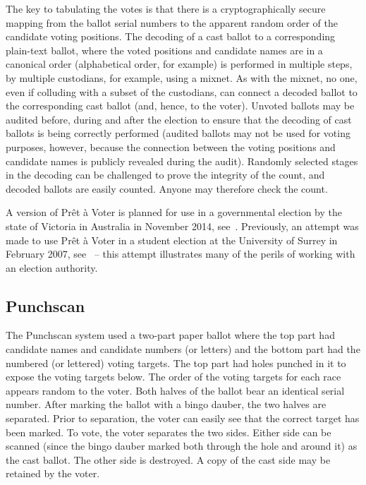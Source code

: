 The key to tabulating the votes is that there is a cryptographically
secure mapping from the ballot serial numbers to the apparent random
order of the candidate voting positions.  The decoding of a cast
ballot to a corresponding plain-text ballot, where the voted positions
and candidate names are in a canonical order (alphabetical order, for
example) is performed in multiple steps, by multiple custodians, for
example, using a mixnet. As with the mixnet, no one, even if colluding
with a subset of the custodians, can connect a decoded ballot to the
corresponding cast ballot (and, hence, to the voter).  Unvoted ballots
may be audited before, during and after the election to ensure that
the decoding of cast ballots is being correctly performed (audited
ballots may not be used for voting purposes, however, because the
connection between the voting positions and candidate names is
publicly revealed during the audit). Randomly selected stages in the
decoding can be challenged to prove the integrity of the count, and
decoded ballots are easily counted.  Anyone may therefore check the
count.

A version of Prêt à Voter is planned for use in a governmental
election by the state of Victoria in Australia in November 2014,
see~\cite{burton2012}.  Previously, an attempt was made to use Prêt à
Voter in a student election at the University of Surrey in February
2007, see~\cite{bismark2007} -- this attempt illustrates many of the
perils of working with an election authority.

\subsection{Punchscan~\cite{popoveniuc2006,popoveniuc2010punchscan}}

The Punchscan system used a two-part paper ballot where the top part
had candidate names and candidate numbers (or letters) and the bottom
part had the numbered (or lettered) voting targets.  The top part had
holes punched in it to expose the voting targets below.  The order of
the voting targets for each race appears random to the voter.  Both
halves of the ballot bear an identical serial number.  After marking
the ballot with a bingo dauber, the two halves are separated.  Prior
to separation, the voter can easily see that the correct target has
been marked.  To vote, the voter separates the two sides.  Either side
can be scanned (since the bingo dauber marked both through the hole
and around it) as the cast ballot. The other side is destroyed. A copy
of the cast side may be retained by the voter.


